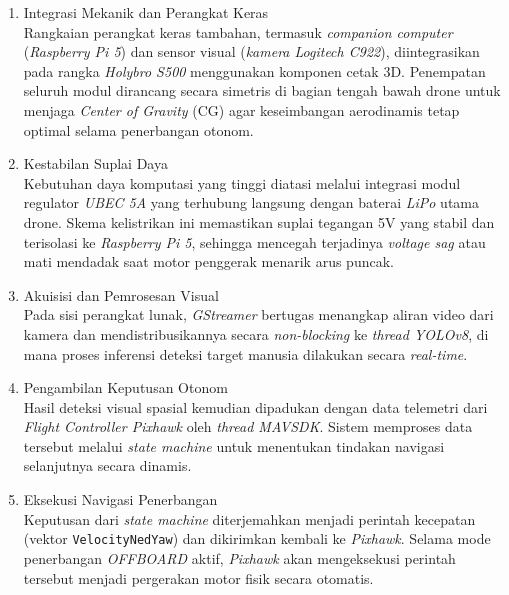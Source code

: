 \begin{enumerate}
	\item Integrasi Mekanik dan Perangkat Keras \\
	Rangkaian perangkat keras tambahan, termasuk \textit{companion computer} (\textit{Raspberry Pi 5}) dan sensor visual (\textit{kamera Logitech C922}), diintegrasikan pada rangka \textit{Holybro S500} menggunakan komponen cetak 3D. Penempatan seluruh modul dirancang secara simetris di bagian tengah bawah drone untuk menjaga \textit{Center of Gravity} (CG) agar keseimbangan aerodinamis tetap optimal selama penerbangan otonom.
	
	\item Kestabilan Suplai Daya \\
	Kebutuhan daya komputasi yang tinggi diatasi melalui integrasi modul regulator \textit{UBEC 5A} yang terhubung langsung dengan baterai \textit{LiPo} utama drone. Skema kelistrikan ini memastikan suplai tegangan 5V yang stabil dan terisolasi ke \textit{Raspberry Pi 5}, sehingga mencegah terjadinya \textit{voltage sag} atau mati mendadak saat motor penggerak menarik arus puncak.
	
	\item Akuisisi dan Pemrosesan Visual \\
	Pada sisi perangkat lunak, \textit{GStreamer} bertugas menangkap aliran video dari kamera dan mendistribusikannya secara \textit{non-blocking} ke \textit{thread YOLOv8}, di mana proses inferensi deteksi target manusia dilakukan secara \textit{real-time}.
	
	\item Pengambilan Keputusan Otonom \\
	Hasil deteksi visual spasial kemudian dipadukan dengan data telemetri dari \textit{Flight Controller Pixhawk} oleh \textit{thread MAVSDK}. Sistem memproses data tersebut melalui \textit{state machine} untuk menentukan tindakan navigasi selanjutnya secara dinamis.
	
	\item Eksekusi Navigasi Penerbangan \\
	Keputusan dari \textit{state machine} diterjemahkan menjadi perintah kecepatan (vektor 
	\texttt{VelocityNedYaw}) dan dikirimkan kembali ke \textit{Pixhawk}. Selama mode penerbangan \textit{OFFBOARD} aktif, \textit{Pixhawk} akan mengeksekusi perintah tersebut menjadi pergerakan motor fisik secara otomatis.
	

\end{enumerate}

